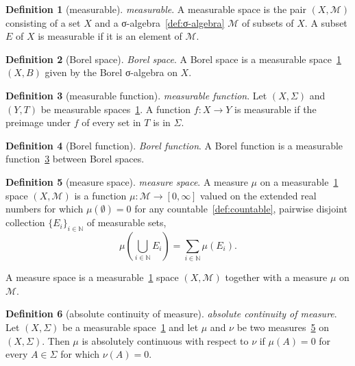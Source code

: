 \documentclass[12pt,a4paper]{article}
\theoremstyle{definition}
\newtheorem{definition}{Definition}
\begin{document}
\begin{definition}[measurable]\label{def:measurable}
\emph{measurable}. A measurable space is the pair $(X,\mathcal M)$ consisting of a set $X$ and a σ-algebra~\ref{def:σ-algebra} $\mathcal M$ of subsets of $X$. A subset $E$ of $X$ is measurable if it is an element of $\mathcal M$.
\end{definition}

\begin{definition}[Borel space]\label{def:borel-space}
\emph{Borel space}. A Borel space is a measurable space~\ref{def:measurable} $(X, B)$ given by the Borel σ-algebra on $X$.
\end{definition}

\begin{definition}[measurable function]\label{def:measurable-function}
\emph{measurable function}. Let $(X,\Sigma)$ and $(Y, T)$ be measurable spaces~\ref{def:measurable}. A function $f:X\to Y$ is measurable if the preimage under $f$ of every set in $T$ is in $\Sigma$.
\end{definition}

\begin{definition}[Borel function]\label{def:borel-function}
\emph{Borel function}. A Borel function is a measurable function~\ref{def:measurable-function} between Borel spaces.
\end{definition}

\begin{definition}[measure space]\label{def:measure-space}
\emph{measure space}. A measure $\mu$ on a measurable~\ref{def:measurable} space $(X,\mathcal M)$ is a function $\mu:\mathcal M \to [0,\infty]$ valued on the extended real numbers for which $\mu(\emptyset) = 0$ for any countable~\ref{def:countable}, pairwise disjoint collection $\{E_i\}_{i\in\mathbb N}$ of measurable sets, $$\mu\left(\bigcup_{i\in\mathbb N} E_i\right) = \sum_{i\in\mathbb N} \mu(E_i).$$

A measure space is a measurable~\ref{def:measurable} space $(X,\mathcal M)$ together with a measure $\mu$ on $\mathcal M$.
\end{definition}

\begin{definition}[absolute continuity of measure]\label{def:absolute-continuity-of-measure}
\emph{absolute continuity of measure}. Let $(X,\Sigma)$ be a measurable space~\ref{def:measurable} and let $\mu$ and $\nu$ be two measures~\ref{def:measure-space} on $(X,\Sigma)$. Then $\mu$ is absolutely continuous with respect to $\nu$ if $\mu(A) =0$ for every $A\in \Sigma$ for which $\nu(A)=0$.
\end{definition}
\end{document}
